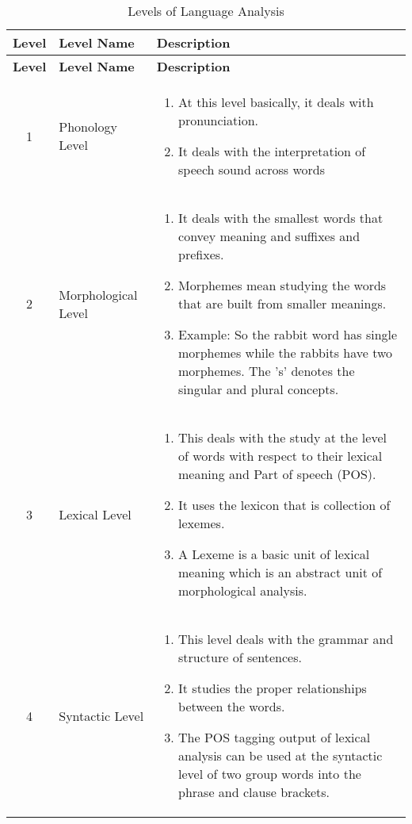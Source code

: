 \begin{longtable}{|c|m{2.7cm}|m{10cm}|}
    \caption{Levels of Language Analysis} \\ \hline

    \textbf{Level} & \textbf{Level Name} & \textbf{Description} \\ \hline
    \endfirsthead
    
    \hline
    \textbf{Level} & \textbf{Level Name} & \textbf{Description} \\ \hline
    \endhead
    \hline \endfoot
    \hline \endlastfoot

    1 & Phonology Level & \begin{enumerate}
        \item At this level basically, it deals with pronunciation.
        \item It deals with the interpretation of speech sound across words
    \end{enumerate} \\ \hline

    2 & Morphological Level & \begin{enumerate}
        \item It deals with the smallest words that convey meaning and suffixes and prefixes.
        \item Morphemes mean studying the words that are built from smaller meanings.
        \item Example: So the rabbit word has single morphemes while the rabbits have two morphemes. The 's' denotes the singular and plural concepts.
    \end{enumerate} \\ \hline

    3 & Lexical Level & \begin{enumerate}
        \item This deals with the study at the level of words with respect to their lexical meaning and Part of speech (POS).
        \item It uses the lexicon that is collection of lexemes.
        \item A Lexeme is a basic unit of lexical meaning which is an abstract unit of morphological analysis.
    \end{enumerate} \\ \hline

    4 & Syntactic Level & \begin{enumerate}
        \item This level deals with the grammar and structure of sentences.
        \item It studies the proper relationships between the words.
        \item The POS tagging output of lexical analysis can be used at the syntactic level of two group words into the phrase and clause brackets.
    \end{enumerate} \\ \hline


\end{longtable}
